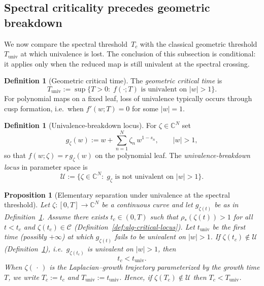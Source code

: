 \documentclass[11pt]{amsart}
\numberwithin{equation}{section}
\theoremstyle{plain}
\newtheorem{proposition}[theorem]{Proposition}
\theoremstyle{definition}
\newtheorem{definition}[theorem]{Definition}
\theoremstyle{remark}
\newcommand{\CC}{\mathbb{C}}
\newcommand{\univ}{\mathrm{univ}}
\begin{document}
\subsection{Spectral criticality precedes geometric breakdown}
\label{subsec:spectral-vs-geom}

We now compare the spectral threshold~$T_c$ with the classical geometric
threshold $T_{\mathrm{univ}}$ at which univalence is lost. The conclusion of this subsection is conditional: it applies only when the reduced map is still univalent at the spectral crossing.


\begin{definition}[Geometric critical time]\label{def:Tuniv}
	The \emph{geometric critical time} is
	\[
		T_{\mathrm{univ}}
		:=
		\sup\bigl\{T>0:\;f(\cdot;T)
		\text{ is univalent on }|w|>1\bigr\}.
	\]
	For polynomial maps on a fixed leaf, loss of univalence typically
	occurs through cusp formation, i.e.\ when $f'(w;T)=0$ for some
	$|w|=1$.
\end{definition}

\begin{definition}[Univalence-breakdown locus]\label{def:calG}
	For $\zeta\in\CC^N$ set
	\[
		g_\zeta(w):=w+\sum_{n=1}^N \zeta_n\,w^{1-s_n},
		\qquad |w|>1,
	\]
	so that $f(w;\zeta)=r\,g_\zeta(w)$ on the polynomial leaf.
	The \emph{univalence-breakdown locus} in parameter space is
	\[
		\mathcal U
		:=
		\bigl\{\zeta\in\CC^N:\;
		g_\zeta \text{ is not univalent on }|w|>1\bigr\}.
	\]
\end{definition}

 \begin{proposition}[Elementary separation under univalence at the spectral threshold]
	\label{prop:zc-before-zuniv}
	Let $\zeta:[0,T]\to\CC^N$ be a continuous curve and let $g_{\zeta(t)}$ be as in Definition~\ref{def:calG}.
	Assume there exists $t_c\in(0,T)$ such that $\rho_*(\zeta(t))>1$ for all $t<t_c$ and
	$\zeta(t_c)\in\mathcal C$ (Definition~\ref{def:alg-critical-locus}).
	Let $t_{\univ}$ be the first time (possibly $+\infty$) at which $g_{\zeta(t)}$ fails to be univalent on $|w|>1$.
	If $\zeta(t_c)\notin\mathcal U$ (Definition~\ref{def:calG}), i.e.\ $g_{\zeta(t_c)}$ \emph{is} univalent on $|w|>1$,
	then
	\[
		t_c < t_{\univ}.
	\]
	When $\zeta(\,\cdot\,)$ is the Laplacian--growth trajectory parameterized by the growth time $T$,
	we write $T_c:=t_c$ and $T_{\univ}:=t_{\univ}$. Hence, if $\zeta(T_c)\notin\mathcal U$ then
	$T_c<T_{\univ}$.
\end{proposition}
\end{document}
